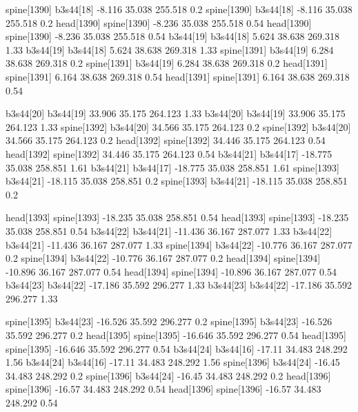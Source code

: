 spine[1390]    b3s44[18]    -8.116    35.038    255.518    0.2
spine[1390]    b3s44[18]    -8.116    35.038    255.518    0.2
head[1390]    spine[1390]    -8.236    35.038    255.518    0.54
head[1390]    spine[1390]    -8.236    35.038    255.518    0.54
b3s44[19]    b3s44[18]    5.624    38.638    269.318    1.33
b3s44[19]    b3s44[18]    5.624    38.638    269.318    1.33
spine[1391]    b3s44[19]    6.284    38.638    269.318    0.2
spine[1391]    b3s44[19]    6.284    38.638    269.318    0.2
head[1391]    spine[1391]    6.164    38.638    269.318    0.54
head[1391]    spine[1391]    6.164    38.638    269.318    0.54


b3s44[20]    b3s44[19]    33.906    35.175    264.123    1.33
b3s44[20]    b3s44[19]    33.906    35.175    264.123    1.33
spine[1392]    b3s44[20]    34.566    35.175    264.123    0.2
spine[1392]    b3s44[20]    34.566    35.175    264.123    0.2
head[1392]    spine[1392]    34.446    35.175    264.123    0.54
head[1392]    spine[1392]    34.446    35.175    264.123    0.54
b3s44[21]    b3s44[17]    -18.775    35.038    258.851    1.61
b3s44[21]    b3s44[17]    -18.775    35.038    258.851    1.61
spine[1393]    b3s44[21]    -18.115    35.038    258.851    0.2
spine[1393]    b3s44[21]    -18.115    35.038    258.851    0.2


head[1393]    spine[1393]    -18.235    35.038    258.851    0.54
head[1393]    spine[1393]    -18.235    35.038    258.851    0.54
b3s44[22]    b3s44[21]    -11.436    36.167    287.077    1.33
b3s44[22]    b3s44[21]    -11.436    36.167    287.077    1.33
spine[1394]    b3s44[22]    -10.776    36.167    287.077    0.2
spine[1394]    b3s44[22]    -10.776    36.167    287.077    0.2
head[1394]    spine[1394]    -10.896    36.167    287.077    0.54
head[1394]    spine[1394]    -10.896    36.167    287.077    0.54
b3s44[23]    b3s44[22]    -17.186    35.592    296.277    1.33
b3s44[23]    b3s44[22]    -17.186    35.592    296.277    1.33


spine[1395]    b3s44[23]    -16.526    35.592    296.277    0.2
spine[1395]    b3s44[23]    -16.526    35.592    296.277    0.2
head[1395]    spine[1395]    -16.646    35.592    296.277    0.54
head[1395]    spine[1395]    -16.646    35.592    296.277    0.54
b3s44[24]    b3s44[16]    -17.11    34.483    248.292    1.56
b3s44[24]    b3s44[16]    -17.11    34.483    248.292    1.56
spine[1396]    b3s44[24]    -16.45    34.483    248.292    0.2
spine[1396]    b3s44[24]    -16.45    34.483    248.292    0.2
head[1396]    spine[1396]    -16.57    34.483    248.292    0.54
head[1396]    spine[1396]    -16.57    34.483    248.292    0.54


